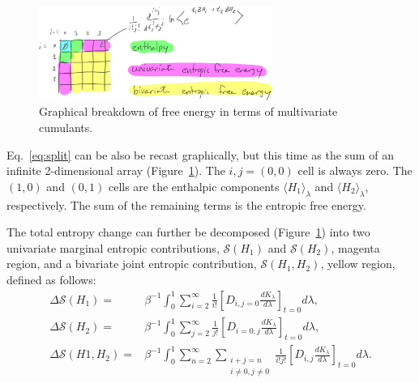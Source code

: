 \documentclass{article}
\begin{document}
\begin{figure}[tb]
\centering
\includegraphics[width=3in]{figure2.pdf}
\caption{Graphical breakdown of free energy in terms of multivariate cumulants.}
\label{fig:2D}
\end{figure}

Eq.~\ref{eq:split} can be also be recast graphically, but this time as the sum of an infinite 2-dimensional array (Figure~\ref{fig:2D}). The $i,j=(0,0)$ cell is always zero. The $(1,0)$ and $(0,1)$ cells are the enthalpic components $\langle H_1 \rangle_\lambda$ and $\langle H_2 \rangle_\lambda$, respectively. The sum of the remaining terms is the entropic free energy. 




The total entropy change can further be decomposed (Figure~\ref{fig:2D}) into two univariate marginal entropic contributions, $\mathcal{S}(H_1)$ and $\mathcal{S}(H_2)$, magenta region, and a bivariate joint entropic contribution, $\mathcal{S}(H_1, H_2)$, yellow region, defined as follows:
\begin{align}
\mathcal{\Delta S}(H_1) =& 
\beta^{-1} \int_0^1 \sum_{i=2}^{\infty} \frac{1}{i!}
    \left[ D_{i,j=0} \frac{dK_\lambda}{d\lambda}\right]_{t=0} d\lambda , 
    \\ 
    \mathcal{\Delta S}(H_2) =& 
    \beta^{-1} \int_0^1 \sum_{j=2}^{\infty} \frac{1}{j!}
    \left[ D_{i=0,j} \frac{dK_\lambda}{d\lambda}\right]_{t=0} d\lambda , 
        \\ 
    \mathcal{\Delta S}(H1,H_2) =& 
    \beta^{-1} \int_0^1 \sum_{n=2}^{\infty} \sum_{\substack{i+j=n \\ i\neq0,j\neq0}} \frac{1}{i!j!}
        \left[ D_{i,j} \frac{dK_\lambda}{d\lambda}\right]_{t=0} d\lambda . 
\label{eq:mult_expansion}
\end{align}
\end{document}
